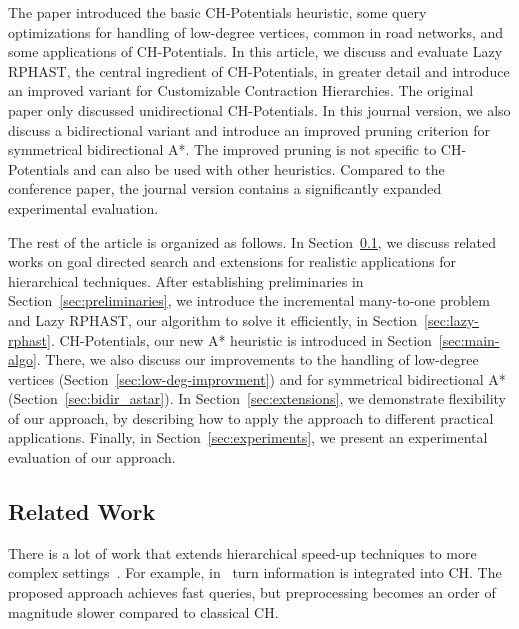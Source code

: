 \documentclass[manuscript,review]{acmart}
\begin{document}
The paper introduced the basic CH-Potentials heuristic, some query optimizations for handling of low-degree vertices, common in road networks, and some applications of CH-Potentials.
In this article, we discuss and evaluate Lazy RPHAST, the central ingredient of CH-Potentials, in greater detail and introduce an improved variant for Customizable Contraction Hierarchies.
The original paper only discussed unidirectional CH-Potentials.
In this journal version, we also discuss a bidirectional variant and introduce an improved pruning criterion for symmetrical bidirectional A*.
The improved pruning is not specific to CH-Potentials and can also be used with other heuristics.
Compared to the conference paper, the journal version contains a significantly expanded experimental evaluation.

The rest of the article is organized as follows.
In Section~\ref{sec:related_work}, we discuss related works on goal directed search and extensions for realistic applications for hierarchical techniques.
After establishing preliminaries in Section~\ref{sec:preliminaries}, we introduce the incremental many-to-one problem and Lazy RPHAST, our algorithm to solve it efficiently, in Section~\ref{sec:lazy-rphast}.
CH-Potentials, our new A* heuristic is introduced in Section~\ref{sec:main-algo}.
There, we also discuss our improvements to the handling of low-degree vertices (Section~\ref{sec:low-deg-improvment}) and for symmetrical bidirectional A* (Section~\ref{sec:bidir_astar}).
In Section~\ref{sec:extensions}, we demonstrate flexibility of our approach, by describing how to apply the approach to different practical applications.
Finally, in Section~\ref{sec:experiments}, we present an experimental evaluation of our approach.

\subsection{Related Work}\label{sec:related_work}

There is a lot of work that extends hierarchical speed-up techniques to more complex settings~\cite{bdgmpsww-rptn-16}.
For example, in~\cite{gv-errnt-11} turn information is integrated into CH.
The proposed approach achieves fast queries, but preprocessing becomes an order of magnitude slower compared to classical CH.
\end{document}
